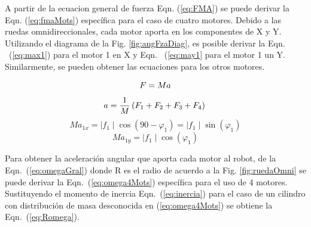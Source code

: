 \documentclass[twocolumn,10pt]{amrob}
\begin{document}
A partir de la ecuacion general de fuerza Eqn. (\ref{eq:FMA}) se puede derivar la Eqn. (\ref{eq:fmaMots}) específica para el caso de cuatro motores. Debido a las ruedas omnidireccionales, cada motor aporta en los componentes de X y Y. Utilizando el diagrama de la Fig. \ref{fig:angFzaDiag}, es posible derivar la Eqn. ~(\ref{eq:max1}) para el motor 1 en X y Eqn. ~(\ref{eq:may1} para el motor 1 un Y. Similarmente, se pueden obtener las ecuaciones para los otros motores.\par
\begin{equation}
  F= Ma \label{eq:FMA} \\
\end{equation}
\begin{equation}
  a = \frac{1}{M}\left(F_1+F_2+F_3+F_4\right) \label{eq:fmaMots} \\
\end{equation}
\begin{equation}
  Ma_{1x} = \mid f_1 \mid \cos\left(90 - \varphi_1\right) =  \mid f_1 \mid  \sin\left(\varphi_1\right)\label{eq:max1}
\end{equation}
\begin{equation}
  Ma_{1y} = \mid f_1 \mid \cos\left(\varphi_1\right) \label{eq:may1}
\end{equation}

Para obtener la aceleración angular que aporta cada motor al robot, de la Eqn.~(\ref{eq:omegaGral}) donde R es el radio de acuerdo a la Fig. \ref{fig:ruedaOmni} se puede derivar la Eqn.~(\ref{eq:omega4Mots}) específica para el uso de 4 motores. Sustituyendo el momento de inercia Eqn.~(\ref{eq:inercia}) para el caso de un cilindro con distribución de masa desconocida en (\ref{eq:omega4Mots}) se obtiene la Eqn.~(\ref{eq:Romega}). \par
\end{document}
